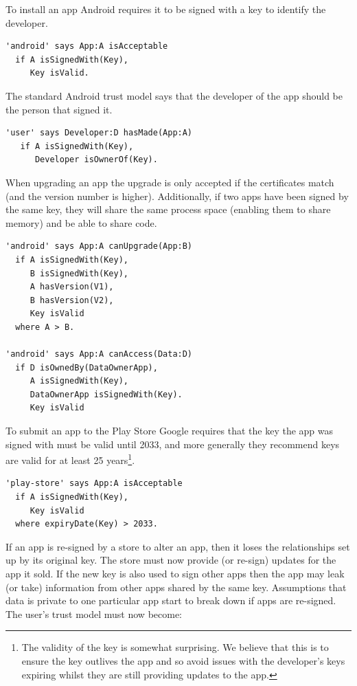 \documentclass[thesis.tex]{subfiles}
\begin{document}
To install an app Android requires it to be signed with a key to
identify the developer.

\begin{lstlisting}
'android' says App:A isAcceptable
  if A isSignedWith(Key),
     Key isValid.
\end{lstlisting}

The standard Android trust model says that the developer of the app should be the person that signed it.

\begin{lstlisting}
'user' says Developer:D hasMade(App:A)
   if A isSignedWith(Key),
      Developer isOwnerOf(Key).
\end{lstlisting}

When upgrading an app the upgrade is only accepted if the certificates match
(and the version number is higher). Additionally, if two apps have been signed by
the same key, they will share the same process space (enabling them to share
memory) and be able to share code.

\begin{lstlisting}
'android' says App:A canUpgrade(App:B)
  if A isSignedWith(Key),
     B isSignedWith(Key),
     A hasVersion(V1),
     B hasVersion(V2),
     Key isValid
  where A > B.
  
'android' says App:A canAccess(Data:D)
  if D isOwnedBy(DataOwnerApp),
     A isSignedWith(Key),
     DataOwnerApp isSignedWith(Key).
     Key isValid
\end{lstlisting}

To submit an app to the Play Store Google requires that the key the
app was signed with must be valid until 2033, and more generally they
recommend keys are valid for at least 25 years\footnote{The validity of the key is somewhat surprising.  We believe that this is to ensure the key outlives the app and so avoid issues with the developer's keys expiring whilst they are still  providing updates to the app.}.

\begin{lstlisting}
'play-store' says App:A isAcceptable
  if A isSignedWith(Key),
     Key isValid
  where expiryDate(Key) > 2033.
\end{lstlisting}

If an app is re-signed by a store to alter an app, then it loses the
relationships set up by its original key. The store must now provide (or
re-sign) updates for the app it sold.
If the new key is also used to sign other apps then the app
may leak (or take) information from other apps shared by the same key.
Assumptions that data is private to one particular app start to break down if
apps are re-signed.  The user's trust model must now become:
\end{document}

